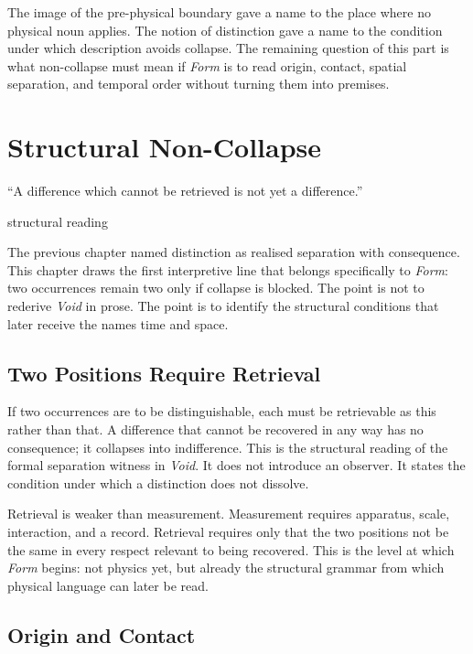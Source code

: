 \documentclass[11pt,a4paper]{book}
\begin{document}
The image of the pre-physical boundary gave a name to the place where no physical noun applies. The notion of distinction gave a name to the condition under which description avoids collapse. The remaining question of this part is what non-collapse must mean if \textit{Form} is to read origin, contact, spatial separation, and temporal order without turning them into premises.

\chapter{Structural Non-Collapse}
\label{ch:one-is-not-enough}

\epigraph{``A difference which cannot be retrieved is not yet a difference.''}{structural reading}

The previous chapter named distinction as realised separation with consequence. This chapter draws the first interpretive line that belongs specifically to \textit{Form}: two occurrences remain two only if collapse is blocked. The point is not to rederive \textit{Void} in prose. The point is to identify the structural conditions that later receive the names time and space.

\section*{Two Positions Require Retrieval}

If two occurrences are to be distinguishable, each must be retrievable as this rather than that. A difference that cannot be recovered in any way has no consequence; it collapses into indifference. This is the structural reading of the formal separation witness in \textit{Void}. It does not introduce an observer. It states the condition under which a distinction does not dissolve.

Retrieval is weaker than measurement. Measurement requires apparatus, scale, interaction, and a record. Retrieval requires only that the two positions not be the same in every respect relevant to being recovered. This is the level at which \textit{Form} begins: not physics yet, but already the structural grammar from which physical language can later be read.

\section*{Origin and Contact}
\end{document}
